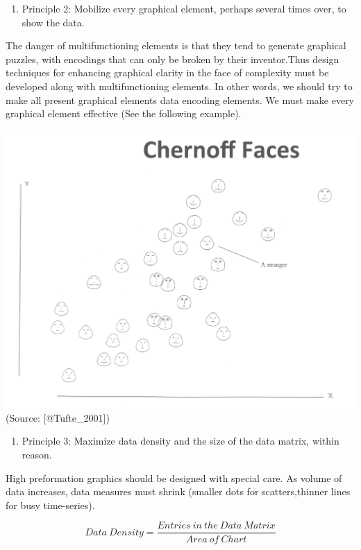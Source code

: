 \documentclass[]{book}
\providecommand{\tightlist}{%
  \setlength{\itemsep}{0pt}\setlength{\parskip}{0pt}}
\theoremstyle{definition}
\theoremstyle{definition}
\theoremstyle{definition}
\theoremstyle{remark}
\begin{document}
\begin{enumerate}
\def\labelenumi{\arabic{enumi}.}
\setcounter{enumi}{1}
\tightlist
\item
  Principle 2: Mobilize every graphical element, perhaps several times
  over, to show the data.
\end{enumerate}

The danger of multifunctioning elements is that they tend to generate
graphical puzzles, with encodings that can only be broken by their
inventor.Thus design techniques for enhancing graphical clarity in the
face of complexity must be developed along with multifunctioning
elements. In other words, we should try to make all present graphical
elements data encoding elements. We must make every graphical element
effective (See the following example).

\includegraphics{images/Tufte_figure6.png} (Source: {[}@Tufte\_2001{]})

\begin{enumerate}
\def\labelenumi{\arabic{enumi}.}
\setcounter{enumi}{2}
\tightlist
\item
  Principle 3: Maximize data density and the size of the data matrix,
  within reason.
\end{enumerate}

High preformation graphics should be designed with special care. As
volume of data increases, data measures must shrink (smaller dots for
scatters,thinner lines for busy time-series).

\[{Data \ Density} = \frac{{Entries \ in \ the \ Data \ Matrix}}{{Area \ of \ Chart}}\]
\end{document}
